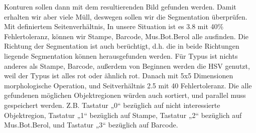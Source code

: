 \documentclass[10pt,a4paper]{report}
\begin{document}
Konturen sollen dann mit dem resultierenden Bild gefunden werden. Damit erhalten wir aber viele Müll, deswegen sollen wir die Segmentation überprüfen. Mit definiertem Seitenverhältnis, In unsere Situation ist es 3.8 mit 40\% Fehlertoleranz, können wir Stampe, Barcode, Mus.Bot.Berol alle ausfinden. Die Richtung der Segmentation ist auch berüchtigt, d.h. die in beide Richtungen liegende Segmentation können herausgefunden werden.
Für Typus ist nichts anderes als Stampe, Barcode, außerdem von Beginnen werden die HSV genutzt, weil der Typus ist alles rot oder ähnlich rot. Danach mit 5x5 Dimensionen morphologische Operation, und Seitverhältnis 2.5 mit 40 Fehlertoleranz.
Die alle gefundenen möglichen Objektregionen würden auch sortiert, und parallel muss gespeichert werden. Z.B. Tastatur „0“ bezüglich auf nicht interessierte Objektregion, Tastatur „1“  bezüglich auf Stampe, Tastatur „2“ bezüglich auf Mus.Bot.Berol, und Tastatur „3“ bezüglich auf Barcode.  
\end{document}
